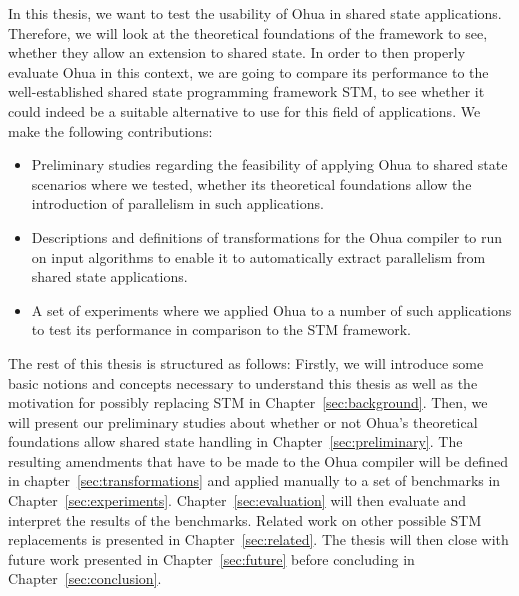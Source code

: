 In this thesis, we want to test the usability of Ohua in shared state applications.
Therefore, we will look at the theoretical foundations of the framework to see, whether they allow an extension to shared state.
In order to then properly evaluate Ohua in this context, we are going to compare its performance to the well-established shared state programming framework STM, to see whether it could indeed be a suitable alternative to use for this field of applications.
We make the following contributions:

\begin{itemize}
    \item Preliminary studies regarding the feasibility of applying Ohua to shared state scenarios where we tested, whether its theoretical foundations allow the introduction of parallelism in such applications.
    \item Descriptions and definitions of transformations for the Ohua compiler to run on input algorithms to enable it to automatically extract parallelism from shared state applications.
    \item A set of experiments where we applied Ohua to a number of such applications to test its performance in comparison to the STM framework.
\end{itemize}

The rest of this thesis is structured as follows:
Firstly, we will introduce some basic notions and concepts necessary to understand this thesis as well as the motivation for possibly replacing STM in Chapter~\ref{sec:background}.
Then, we will present our preliminary studies about whether or not Ohua's theoretical foundations allow shared state handling in Chapter~\ref{sec:preliminary}.
The resulting amendments that have to be made to the Ohua compiler will be defined in chapter~\ref{sec:transformations} and applied manually to a set of benchmarks in Chapter~\ref{sec:experiments}.
Chapter~\ref{sec:evaluation} will then evaluate and interpret the results of the benchmarks.
Related work on other possible STM replacements is presented in Chapter~\ref{sec:related}.
The thesis will then close with future work presented in Chapter~\ref{sec:future} before concluding in Chapter~\ref{sec:conclusion}.
